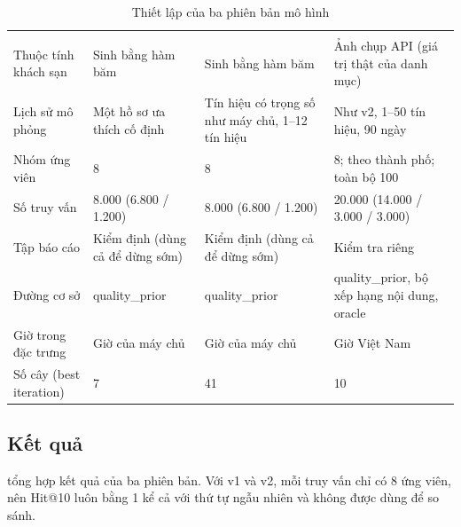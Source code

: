 \begin{rtable}
\begin{longtable}{|L{3.8cm}|L{3.5cm}|L{3.5cm}|L{3.8cm}|}
\caption{Thiết lập của ba phiên bản mô hình}\label{tab:model-versions}\\
\hline
{} &  &  &  \\ \hline
\endfirsthead
\hline
{} &  &  &  \\ \hline
\endhead
Thuộc tính khách sạn & Sinh bằng hàm băm & Sinh bằng hàm băm & Ảnh chụp API (giá trị thật của danh mục) \\ \hline
Lịch sử mô phỏng & Một hồ sơ ưa thích cố định & Tín hiệu có trọng số như máy chủ, 1--12 tín hiệu & Như v2, 1--50 tín hiệu, 90 ngày \\ \hline
Nhóm ứng viên & 8 & 8 & 8; theo thành phố; toàn bộ 100 \\ \hline
Số truy vấn & 8.000 (6.800 / 1.200) & 8.000 (6.800 / 1.200) & 20.000 (14.000 / 3.000 / 3.000) \\ \hline
Tập báo cáo & Kiểm định (dùng cả để dừng sớm) & Kiểm định (dùng cả để dừng sớm) & Kiểm tra riêng \\ \hline
Đường cơ sở & quality\_prior & quality\_prior & quality\_prior, bộ xếp hạng nội dung, oracle \\ \hline
Giờ trong đặc trưng & Giờ của máy chủ & Giờ của máy chủ & Giờ Việt Nam \\ \hline
Số cây (best iteration) & 7 & 41 & 10 \\ \hline
\end{longtable}
\end{rtable}

\subsection{Kết quả}

 tổng hợp kết quả của ba phiên bản. Với v1 và v2, mỗi truy vấn chỉ có 8 ứng viên, nên Hit@10 luôn bằng 1 kể cả với thứ tự ngẫu nhiên và không được dùng để so sánh.

